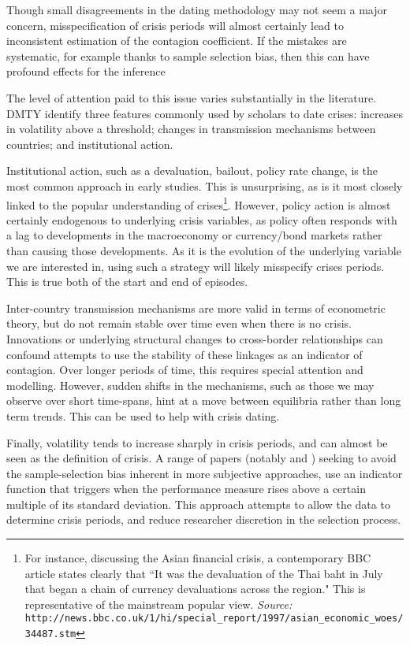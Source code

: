 \documentclass[../base.tex]{subfiles}
\begin{document}
Though small disagreements in the dating methodology may not seem a major concern, misspecification of crisis periods will almost certainly lead to inconsistent estimation of the contagion coefficient. If the mistakes are systematic, for example thanks to sample selection bias, then this can have profound effects for the inference 

The level of attention paid to this issue varies substantially in the literature. DMTY identify three  features commonly used by scholars to date crises: increases in volatility above a threshold; changes in transmission mechanisms between countries; and institutional action.

Institutional action, such as a devaluation, bailout, policy rate change, is the most common approach in early studies. This is unsurprising, as is it most closely linked to the popular understanding of crises\footnote{For instance, discussing the Asian financial crisis, a contemporary BBC article states clearly that ``It was the devaluation of the Thai baht in July that began a chain of currency devaluations across the region." This is representative of the mainstream popular view.
	\textit{Source:} \texttt{http://news.bbc.co.uk/1/hi/special\_report/1997/asian\_economic\_woes/34487.stm}}. However, policy action is almost certainly endogenous to underlying crisis variables, as policy often responds with a lag to developments in the macroeconomy or currency/bond markets rather than causing those developments. As it is the evolution of the underlying variable we are interested in, using such a strategy will likely misspecify crises periods. This is true both of the start and end of episodes. 

Inter-country transmission mechanisms are more valid in terms of econometric theory, but do not remain stable over time even when there is no crisis. Innovations or underlying structural changes to cross-border relationships can confound attempts to use the stability of these linkages as an indicator of contagion. Over longer periods of time, this requires special attention and modelling. However, sudden shifts in the mechanisms, such as those we may observe over short time-spans, hint at a move between equilibria rather than long term trends. This can be used to help with crisis dating.

Finally, volatility tends to increase sharply in crisis periods, and can almost be seen as the definition of crisis. A range of papers (notably \cite{eichengreen1996contagious} and \cite{pesaran2007econometric}) seeking to avoid the sample-selection bias inherent in more subjective approaches, use an indicator function that triggers when the performance measure rises above a certain multiple of its standard deviation. This approach attempts to allow the data to determine crisis periods, and reduce researcher discretion in the selection process.
\end{document}
